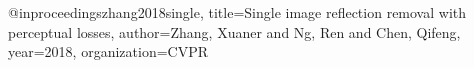 @inproceedings{zhang2018single,
  title={Single image reflection removal with perceptual losses},
  author={Zhang, Xuaner and Ng, Ren and Chen, Qifeng},
  year={2018},
  organization={CVPR}
}